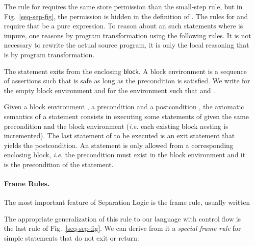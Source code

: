 \documentclass{llncs}
\newcommand{\tyface}[1]{\ensuremath{\mathsf{#1}}}
\newcommand{\Sassign}[2]{#1:=#2}
\newcommand{\Sstore}[3]{\tyface{[}#2\tyface{]}_{#1}\tyface{:=}#3}
\newcommand{\Sif}[3]{\tyface{if}\,#1\,\tyface{then}\,#2\,\tyface{else}\,#3}
\newcommand{\Sseq}[2]{#1;#2}
\newcommand{\semax}[6]{#1;#2;#3\vdash \{#4\}#5\{#6\}}
\begin{document}
The rule for  requires the same store permission 
than the
small-step rule, but in Fig.~\ref{seq-sep-fig}, the permission is hidden in the definition of
.
The rules for  and  require that
 be a pure expression.  To reason about an such statements
where  is impure, one reasons by program transformation
using the following rules. It is not necessary to rewrite the actual source
program, it is only the local reasoning that is by program 
transformation.
\vspace{-2pt}

The statement  exits from the  enclosing
\tyface{block}.
A block environment  is a sequence of assertions
 such that  is safe
as long as the precondition  is satisfied.  We
write  for the empty block environment
and  for the environment such that
 and .

Given a block environment , a precondition  and a postcondition ,
the axiomatic semantics of a  statement consists in executing
some statements of
 given the same precondition  and the block environment 
(\textit{i.e.} each existing block nesting is incremented).
The last statement of  to be executed is an exit statement that yields the
 postcondition.
An  statement is only allowed from a corresponding enclosing block,
\textit{i.e.} the precondition  must exist in the block environment 
and it is the precondition of the  statement.





\paragraph{Frame Rules.}
The most important feature of Separation Logic is the frame rule, usually written
\vspace{-6pt}
 
The appropriate generalization of this rule to our language with control flow
is the last rule of Fig.~\ref{seq-sep-fig}. 
We can derive from it a \emph{special frame rule}
for simple statements  that
do not exit or return:
\end{document}
